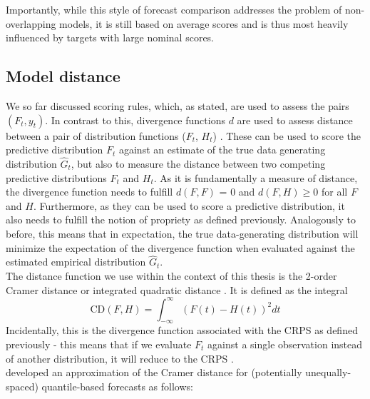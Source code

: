 Importantly, while this style of forecast comparison addresses the problem of non-overlapping models, it is still based on average scores and is thus most heavily influenced by targets with large nominal scores. %
\subsection{Model distance}
We so far discussed scoring rules, which, as stated, are used to assess the pairs $(F_t, y_t)$. In contrast to this, divergence functions $d$ are used to assess distance between a pair of distribution functions ($F_t$, $H_t$) \citep{thorarinsdottir_using_2013}. These can be used to score the predictive distribution $F_t$ against an estimate of the true data generating distribution $\hat{G}_t$, but also to measure the distance between two competing predictive distributions $F_t$ and $H_t$. As it is fundamentally a measure of distance, the divergence function needs to fulfill $d(F,F)$ = 0 and $d(F,H)\geq 0$ for all $F$ and $H$. Furthermore, as they can be used to score a predictive distribution, it also needs to fulfill the notion of propriety as defined previously. Analogously to before, this means that in expectation, the true data-generating distribution will minimize the expectation of the divergence function when evaluated against the estimated empirical distribution $\hat{G}_t$. \\
The distance function we use within the context of this thesis is the 2-order Cramer distance or integrated quadratic distance \citep{thorarinsdottir_using_2013}. It is defined as the integral
\begin{equation*}
\text{CD}(F, H) = \int_{-\infty}^{\infty}\left(F(t) - H(t) \right)^2dt
\end{equation*}
Incidentally, this is the divergence function associated with the CRPS as defined previously - this means that if we evaluate $F_t$ against a single observation instead of another distribution, it will reduce to the CRPS \citep{gneiting_strictly_2007}.\\
\cite{wang_covidhubutils_2022} developed an approximation of the Cramer distance for (potentially unequally-spaced) quantile-based forecasts as follows:
